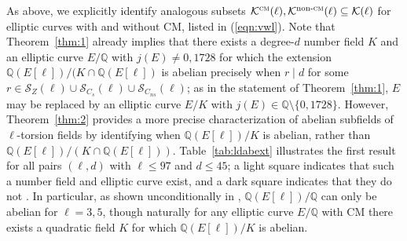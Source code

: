 \documentclass[table,dvipsnames]{amsart}
\newcommand{\Q}{\mathbb{Q}}
\numberwithin{equation}{section}
\newcommand{\s}{\textit{s}}
\newcommand{\ns}{\textit{ns}}
\newcommand{\Cs}{C_\s}
\newcommand{\Cns}{C_\ns}
\newcommand{\CM}{\textsc{cm}}
\newcommand{\nonCM}{{\textrm{non-}\textsc{cm}}}
\begin{document}
As above, we explicitly identify analogous subsets $\mathcal{K}^\CM(\ell),\mathcal{K}^\nonCM(\ell)\subseteq\mathcal{K}(\ell)$ for elliptic curves with and without CM, listed in (\ref{eqn:vwl}). Note that Theorem~\ref{thm:1} already implies that there exists a degree-$d$ number field $K$ and an elliptic curve $E/\Q$ with $j(E)\ne 0,1728$ for which the extension $\Q(E[\ell])/(K\cap\Q(E[\ell])$ is abelian precisely when $r\mid d$ for some $r\in\mathcal{S}_Z(\ell)\cup\mathcal{S}_{\Cs}(\ell)\cup\mathcal{S}_{\Cns}(\ell)$; as in the statement of Theorem~\ref{thm:1}, $E$ may be replaced by an elliptic curve $E/K$ with $j(E)\in\Q\setminus\{0,1728\}$. However, Theorem~\ref{thm:2} provides a more precise characterization of abelian subfields of $\ell$-torsion fields by identifying when $\Q(E[\ell])/K$ is abelian, rather than $\Q(E[\ell])/(K\cap\Q(E[\ell]))$. Table~\ref{tab:ldabext} illustrates the first result for all pairs $(\ell,d)$ with $\ell\le 97$ and $d\le 45$; a light square indicates that such a number field and elliptic curve exist, and a dark square indicates that they do not \cite{code}. In particular, as shown unconditionally in \cite[Thm.~1.1]{lozanorobledo2015}, $\Q(E[\ell])/\Q$ can only be abelian for $\ell=3,5$, though naturally for any elliptic curve $E/\Q$ with CM there exists a quadratic field $K$ for which $\Q(E[\ell])/K$ is abelian.
\end{document}
